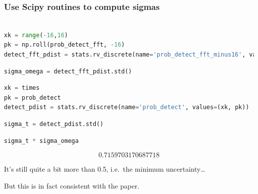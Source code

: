 










\hypertarget{use-scipy-routines-to-compute-sigmas}{%
\subsubsection{Use Scipy routines to compute
sigmas}\label{use-scipy-routines-to-compute-sigmas}}

\begin{lstlisting}[language=Python]

xk = range(-16,16)
pk = np.roll(prob_detect_fft, -16)
detect_fft_pdist = stats.rv_discrete(name='prob_detect_fft_minus16', values=(xk, pk))
\end{lstlisting}

\begin{lstlisting}[language=Python]
sigma_omega = detect_fft_pdist.std()
\end{lstlisting}

\begin{lstlisting}[language=Python]
xk = times
pk = prob_detect
detect_pdist = stats.rv_discrete(name='prob_detect', values=(xk, pk))
\end{lstlisting}

\begin{lstlisting}[language=Python]
sigma_t = detect_pdist.std()
\end{lstlisting}

\begin{lstlisting}[language=Python]
sigma_t * sigma_omega
\end{lstlisting}

\[0.7159703170687718\]

It's still quite a bit more than 0.5, i.e.~the minimum
uncertainty\ldots{}

But this is in fact consistent with the paper.
